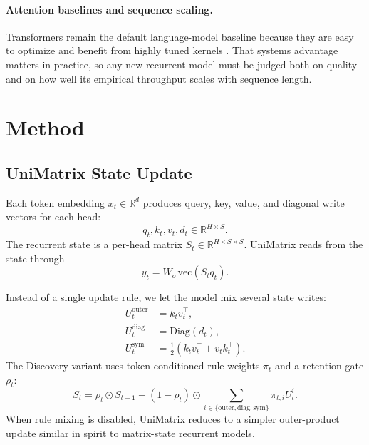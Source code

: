 \documentclass[11pt]{article}
\begin{document}
\paragraph{Attention baselines and sequence scaling.}
Transformers remain the default language-model baseline because they are easy
to optimize and benefit from highly tuned kernels \citep{vaswani2017attention}.
That systems advantage matters in practice, so any new recurrent model must be
judged both on quality and on how well its empirical throughput scales with
sequence length.

\section{Method}
\subsection{UniMatrix State Update}
Each token embedding $x_t \in \mathbb{R}^{d}$ produces query, key, value, and
diagonal write vectors for each head:
\begin{equation}
q_t, k_t, v_t, d_t \in \mathbb{R}^{H \times S}.
\end{equation}
The recurrent state is a per-head matrix $S_t \in \mathbb{R}^{H \times S \times
S}$. UniMatrix reads from the state through
\begin{equation}
y_t = W_o \, \mathrm{vec}(S_t q_t).
\end{equation}

Instead of a single update rule, we let the model mix several state writes:
\begin{align}
U_t^{\text{outer}} &= k_t v_t^\top, \\
U_t^{\text{diag}} &= \mathrm{Diag}(d_t), \\
U_t^{\text{sym}} &= \frac{1}{2} \left(k_t v_t^\top + v_t k_t^\top\right).
\end{align}
The Discovery variant uses token-conditioned rule weights $\pi_t$ and a
retention gate $\rho_t$:
\begin{equation}
S_t = \rho_t \odot S_{t-1} + (1 - \rho_t) \odot
\sum_{i \in \{\text{outer}, \text{diag}, \text{sym}\}} \pi_{t,i} U_t^i.
\end{equation}
When rule mixing is disabled, UniMatrix reduces to a simpler outer-product
update similar in spirit to matrix-state recurrent models.
\end{document}
